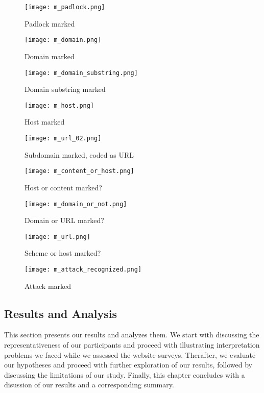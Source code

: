 \begin{figure}
\centering
\texttt{[image: m\_padlock.png]}
\caption{Padlock marked}
\label{fig:padlock}
\end{figure}

\begin{figure}
\centering
\texttt{[image: m\_domain.png]}
\caption{Domain marked}
\label{fig:m_domain}
\end{figure}


\begin{figure}
\centering
\texttt{[image: m\_domain\_substring.png]}
\caption{Domain substring marked}
\label{fig:m_domain_substring}
\end{figure}

\begin{figure}
\centering
\texttt{[image: m\_host.png]}
\caption{Host marked}
\label{fig:m_host}
\end{figure}

\begin{figure}
\centering
\texttt{[image: m\_url\_02.png]}
\caption{Subdomain marked, coded as URL}
\label{fig:m_url_02}
\end{figure}

\begin{figure}
\centering
\texttt{[image: m\_content\_or\_host.png]}
\caption{Host or content marked?}
\label{fig:m_content_or_host}
\end{figure}

\begin{figure}
\centering
\texttt{[image: m\_domain\_or\_not.png]}
\caption{Domain or URL marked?}
\label{fig:m_domain_or_not}
\end{figure}

\begin{figure}
\centering
\texttt{[image: m\_url.png]}
\caption{Scheme or host marked?}
\label{fig:m_url}
\end{figure}

\begin{figure}
\centering
\texttt{[image: m\_attack\_recognized.png]}
\caption{Attack marked}
\label{fig:m_attack_recognized}
\end{figure}



\subsection{Results and Analysis}
This section presents our results and analyzes them. 
We start with discussing the representativeness of our participants and proceed with illustrating interpretation problems we faced while we assessed the website-surveys.
Therafter, we evaluate our hypotheses and proceed with further exploration of our results, followed by discussing the limitations of our study.
Finally, this chapter concludes with a disussion of our results and a corresponding summary. 

